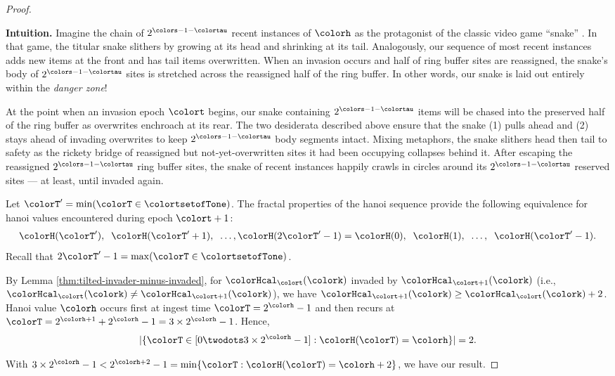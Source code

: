 \begin{proof}
\begin{mybox}
\textbf{Intuition.}
Imagine the chain of $2^{\colors - 1 - \colortau}$ recent instances of \hv{} $\colorh$ as the protagonist of the classic video game ``snake'' \citep{de2016complexity}.
In that game, the titular snake slithers by growing at its head and shrinking at its tail.
Analogously, our sequence of most recent \hv{} instances adds new items at the front and has tail items overwritten.
When an invasion occurs and half of ring buffer sites are reassigned, the snake's body of $2^{\colors - 1 - \colortau}$ sites is stretched across the reassigned half of the ring buffer.
In other words, our snake is laid out entirely within the \textit{danger zone}!

At the point when an invasion epoch $\colort$ begins, our snake containing $2^{\colors - 1 - \colortau}$ items will be chased into the preserved half of the ring buffer as overwrites enchroach at its rear.
The two desiderata described above ensure that the snake (1) pulls ahead and (2) stays ahead of invading overwrites to keep $2^{\colors - 1 - \colortau}$ body segments intact.
Mixing metaphors, the snake slithers head then tail to safety as the rickety bridge of reassigned but not-yet-overwritten sites it had been occupying collapses behind it.
After escaping the reassigned $2^{\colors - 1 - \colortau}$ ring buffer sites, the snake of recent \hv{} instances happily crawls in circles around its $2^{\colors - 1 - \colortau}$ reserved sites --- at least, until invaded again.
\end{mybox}

\begin{proofpart}
Let $\colorT' = \min(\colorT \in \colortsetofTone)$.
The fractal properties of the hanoi sequence provide the following equivalence for hanoi values encountered during epoch $\colort + 1$:
\begin{align*}
\colorH(\colorT'),\;\; \colorH(\colorT'+1), \;\;\ldots, \colorH(2\colorT' - 1) = \colorH(0),\;\; \colorH(1), \;\;\ldots,\;\; \colorH(\colorT' - 1).
\end{align*}
Recall that $2\colorT' - 1 = \max(\colorT \in \colortsetofTone)$.

By Lemma \ref{thm:tilted-invader-minus-invaded}, for \hv{} $\colorHcal_{\colort}(\colork)$ invaded by \hv{} $\colorHcal_{\colort + 1}(\colork)$ (i.e., $\colorHcal_{\colort}(\colork) \neq \colorHcal_{\colort + 1}(\colork)$), we have $\colorHcal_{\colort + 1}(\colork) \geq \colorHcal_{\colort}(\colork) + 2$.
Hanoi value $\colorh$ occurs first at ingest time $\colorT = 2^{\colorh} - 1$ and then recurs at $\colorT = 2^{\colorh + 1} + 2^{\colorh} - 1 = 3 \times 2^{\colorh} - 1$.
Hence,
\begin{align*}
|\{\colorT \in [0 \twodots 3 \times 2^{\colorh} - 1] : \colorH(\colorT) = \colorh\}| = 2.
\end{align*}
\end{proofpart}
With $3 \times 2^{\colorh} - 1 < 2^{\colorh + 2} - 1 = \min\{\colorT : \colorH(\colorT) = \colorh + 2\}$, we have our result.


\end{proof}
